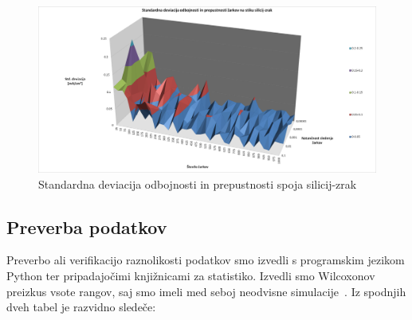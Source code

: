\documentclass[a4paper,twoside,openright,12pt,slovene]{book}
\begin{document}
\begin{figure}[H]
    \centering
    \includegraphics[trim={20 1 10 1}, clip, width=150mm]{Slike/deviacija3D_Si_air_contTexture.png}
    \caption{Standardna deviacija odbojnosti in prepustnosti spoja silicij-zrak}
    \label{fig:std_Si_air}
\end{figure}

\subsection{Preverba podatkov}

Preverbo ali verifikacijo raznolikosti podatkov smo izvedli s programskim jezikom Python ter pripadajočimi knjižnicami za statistiko. Izvedli smo Wilcoxonov preizkus vsote rangov, saj smo imeli med seboj neodvisne simulacije\ \cite{predavanje}. Iz spodnjih dveh tabel je razvidno sledeče:
\end{document}
